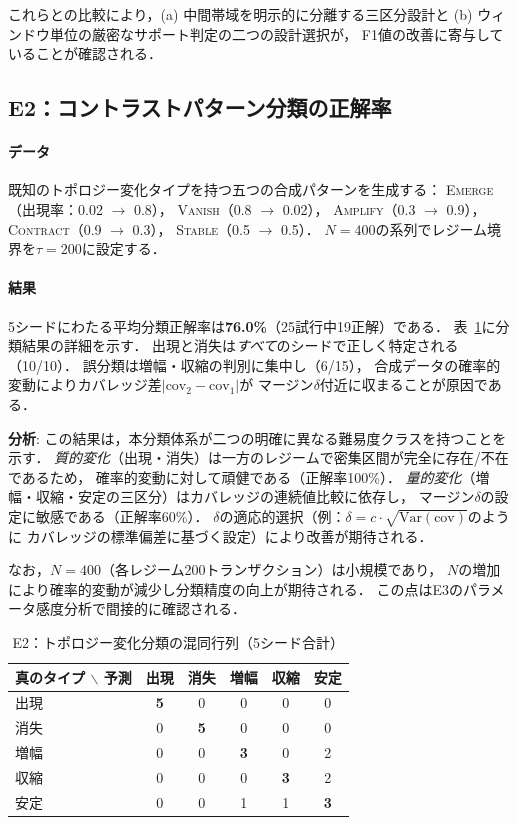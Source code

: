 これらとの比較により，(a) 中間帯域を明示的に分離する三区分設計と
(b) ウィンドウ単位の厳密なサポート判定の二つの設計選択が，
F1値の改善に寄与していることが確認される．

\subsection{E2：コントラストパターン分類の正解率}

\paragraph{データ}
既知のトポロジー変化タイプを持つ五つの合成パターンを生成する：
\textsc{Emerge}（出現率：0.02 $\rightarrow$ 0.8），
\textsc{Vanish}（0.8 $\rightarrow$ 0.02），
\textsc{Amplify}（0.3 $\rightarrow$ 0.9），
\textsc{Contract}（0.9 $\rightarrow$ 0.3），
\textsc{Stable}（0.5 $\rightarrow$ 0.5）．
$N = 400$の系列でレジーム境界を$\tau = 200$に設定する．

\paragraph{結果}
5シードにわたる平均分類正解率は\textbf{76.0\%}（25試行中19正解）である．
表~\ref{tab:e2_confusion}に分類結果の詳細を示す．
出現と消失は\emph{すべて}のシードで正しく特定される（10/10）．
誤分類は増幅・収縮の判別に集中し（6/15），
合成データの確率的変動によりカバレッジ差$|\text{cov}_2 - \text{cov}_1|$が
マージン$\delta$付近に収まることが原因である．

\textbf{分析}: この結果は，本分類体系が二つの明確に異なる難易度クラスを持つことを示す．
\emph{質的変化}（出現・消失）は一方のレジームで密集区間が完全に存在/不在であるため，
確率的変動に対して頑健である（正解率100\%）．
\emph{量的変化}（増幅・収縮・安定の三区分）はカバレッジの連続値比較に依存し，
マージン$\delta$の設定に敏感である（正解率60\%）．
$\delta$の適応的選択（例：$\delta = c \cdot \sqrt{\text{Var}(\text{cov})}$のように
カバレッジの標準偏差に基づく設定）により改善が期待される．

なお，$N = 400$（各レジーム200トランザクション）は小規模であり，
$N$の増加により確率的変動が減少し分類精度の向上が期待される．
この点はE3のパラメータ感度分析で間接的に確認される．

\begin{table}[t]
\centering
\caption{E2：トポロジー変化分類の混同行列（5シード合計）}
\label{tab:e2_confusion}
\begin{tabular}{l|ccccc}
\toprule
真のタイプ $\backslash$ 予測 & 出現 & 消失 & 増幅 & 収縮 & 安定 \\
\midrule
出現   & \textbf{5} & 0 & 0 & 0 & 0 \\
消失   & 0 & \textbf{5} & 0 & 0 & 0 \\
増幅   & 0 & 0 & \textbf{3} & 0 & 2 \\
収縮   & 0 & 0 & 0 & \textbf{3} & 2 \\
安定   & 0 & 0 & 1 & 1 & \textbf{3} \\
\bottomrule
\end{tabular}
\end{table}

